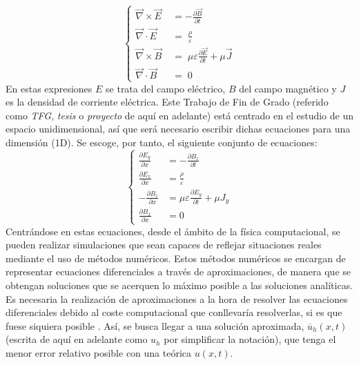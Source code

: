 \documentclass[11pt,a4paper,twoside,pdf]{article}
\numberwithin{equation}{section}
\begin{document}
\begin{equation}
\left\{
\begin{aligned}
\vec{\nabla} \times \vec{E}\; &= -\frac{\partial \vec{B}}{\partial t} \\[10pt]
\vec{\nabla} \cdot \vec{E} \;\;&= \;\frac{\rho}{\varepsilon} \\[10pt]
\vec{\nabla} \times \vec{B}\; &= \;\mu \varepsilon \frac{\partial \vec{E}}{\partial t} + \mu \vec{J} \\[10pt]
\vec{\nabla} \cdot \vec{B}\;\; &= \;0
\end{aligned}
\right.
\label{eq:maxwell1}
\end{equation}
En estas expresiones $E$ se trata del campo eléctrico, $B$ del campo magnético y $J$ es la densidad de corriente eléctrica.
Este Trabajo de Fin de Grado (referido como \textit{TFG}, \textit{tesis} o \textit{proyecto} de aquí en adelante) está centrado en el estudio de un espacio unidimensional, así que será necesario escribir dichas ecuaciones para una dimensión (1D). Se escoge, por tanto, el siguiente conjunto de ecuaciones:
\begin{equation}
\left\{
\begin{aligned}
\frac{\partial E_y}{\partial x} &= -\frac{\partial B_z}{\partial t} \\[10pt]
\frac{\partial E_x}{\partial x} &= \frac{\rho}{\varepsilon} \\[10pt]
-\frac{\partial B_z}{\partial x} &= \mu \varepsilon \frac{\partial E_y}{\partial t} + \mu J_y \\[10pt]
\frac{\partial B_x}{\partial x} &= 0
\end{aligned}
\right.
\label{eq:Maxwell1D}
\end{equation}
Centrándose en estas ecuaciones, desde el ámbito de la física computacional, se pueden realizar simulaciones que sean capaces de reflejar situaciones reales mediante el uso de métodos numéricos. Estos métodos numéricos se encargan de representar ecuaciones diferenciales a través de aproximaciones, de manera que se obtengan soluciones que se acerquen lo máximo posible a las soluciones analíticas. Es necesaria la realización de aproximaciones a la hora de resolver las ecuaciones diferenciales debido al coste computacional que conllevaría resolverlas, si es que fuese siquiera posible \cite{numericos}. Así, se busca llegar a una solución aproximada, $\overline{u}_h(x,t)$ (escrita de aquí en adelante como $u_h$ por simplificar la notación), que tenga el menor error relativo posible con una teórica $u(x,t)$. 
\end{document}
